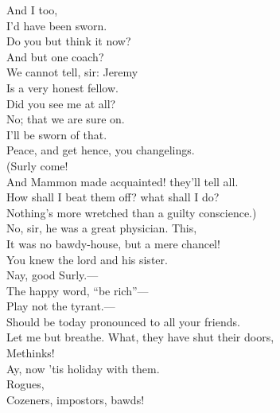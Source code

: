 \documentclass[a4paper,oneside,12pt]{memoir}
\begin{document}
\begin{drama*}
\neightwospeaks {} And I too,\\
I'd have been sworn.\\
\lovewitspeaks {} Do you but think it now?\\
And but one coach?\\
\neighthreespeaks {} We cannot tell, sir: Jeremy\\
Is a very honest fellow.\\
\facespeaks {} Did you see me at all?\\
\neighonespeaks No; that we are sure on.\\
\neightwospeaks {} I'll be sworn of that.\\
\lovewitspeaks Peace, and get hence, you changelings.\\
\facespeaks {} (Surly come!\\
And Mammon made acquainted! they'll tell all.\\
How shall I beat them off? what shall I do?\\
Nothing's more wretched than a guilty conscience.)\\
\surlyspeaks No, sir, he was a great physician. This,\\
It was no bawdy-house, but a mere chancel!\\
You knew the lord and his sister.\\
\mammonspeaks {} Nay, good Surly.---\\
\surlyspeaks The happy word, ``be rich''---\\
\mammonspeaks {} Play not the tyrant.---\\
\surlyspeaks Should be today pronounced to all your friends.\\
\mammonspeaks Let me but breathe. What, they have shut their doors,\\
Methinks!\\
\surlyspeaks {} Ay, now 'tis holiday with them.\\
\mammonspeaks Rogues,\\
 Cozeners, impostors, bawds!\\

\end{drama*}
\end{document}
